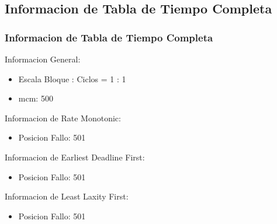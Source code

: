 \documentclass[xcolor=table]{beamer}
\begin{document}
\subsection{Informacion de Tabla de Tiempo Completa} 

\begin{frame} 
\frametitle{Informacion de Tabla de Tiempo Completa} 
Informacion General:\\ 
\begin{itemize} 
\item Escala Bloque : Ciclos = 1 : 1 \\ 
\item mcm:  500 \\ 
\end{itemize} 
Informacion de Rate Monotonic:\\ 
\begin{itemize} 
\item Posicion Fallo:  501 \\ 
\end{itemize} 
Informacion de Earliest Deadline First:\\ 
\begin{itemize} 
\item Posicion Fallo:  501 \\ 
\end{itemize} 
Informacion de Least Laxity First:\\ 
\begin{itemize} 
\item Posicion Fallo:  501 \\ 
\end{itemize} 
\end{frame} 

\end{document}
